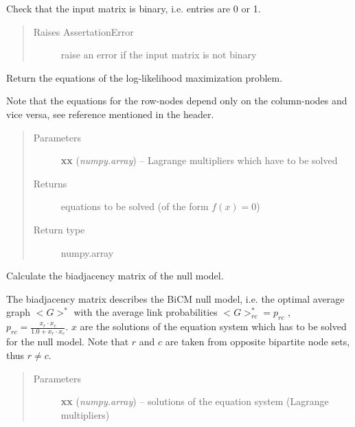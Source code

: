 \documentclass[letterpaper,10pt,english]{sphinxmanual}
\begin{document}
\begin{fulllineitems}
\begin{fulllineitems}
\label{source/src:src.bicm.BiCM.check_input_matrix_is_binary}
Check that the input matrix is binary, i.e. entries are 0 or 1.
\begin{quote}\begin{description}
\item[{Raises AssertationError}] \leavevmode
raise an error if the input matrix is not
binary

\end{description}\end{quote}

\end{fulllineitems}


\begin{fulllineitems}
\label{source/src:src.bicm.BiCM.equations}
Return the equations of the log-likelihood maximization problem.

Note that the equations for the row-nodes depend only on the
column-nodes and vice versa, see reference mentioned in the header.
\begin{quote}\begin{description}
\item[{Parameters}] \leavevmode
\textbf{xx} (\emph{numpy.array}) -- Lagrange multipliers which have to be solved

\item[{Returns}] \leavevmode
equations to be solved (of the form \(f(x) = 0\))

\item[{Return type}] \leavevmode
numpy.array

\end{description}\end{quote}

\end{fulllineitems}


\begin{fulllineitems}
\label{source/src:src.bicm.BiCM.get_biadjacency_matrix}
Calculate the biadjacency matrix of the null model.

The biadjacency matrix describes the BiCM null model, i.e. the optimal
average graph \(<G>^*\) with the average link probabilities
\(<G>^*_{rc} = p_{rc}\) ,
\(p_{rc} = \frac{x_r \cdot x_c}{1.0 + x_r\cdot x_c}.\)
\(x\) are the solutions of the equation system which has to be
solved for the null model.
Note that \(r\) and \(c\) are taken from opposite bipartite
node sets, thus \(r \neq c\).
\begin{quote}\begin{description}
\item[{Parameters}] \leavevmode
\textbf{xx} (\emph{numpy.array}) -- solutions of the equation system (Lagrange multipliers)


\end{description}
\end{quote}
\end{fulllineitems}
\end{fulllineitems}
\end{document}
